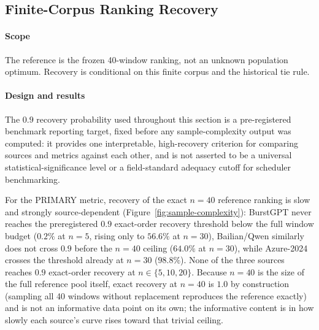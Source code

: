 \subsection{Finite-Corpus Ranking Recovery}
\label{sec:sample-complexity}

\paragraph{Scope}
\label{sec:sample-complexity-motivation}

The reference is the frozen 40-window ranking, not an unknown population optimum. Recovery is conditional on this finite corpus and the historical tie rule.

\paragraph{Design and results}
\label{sec:sample-complexity-design}

The $0.9$ recovery probability used throughout this section is a
pre-registered benchmark reporting target, fixed before any
sample-complexity output was computed: it provides one interpretable,
high-recovery criterion for comparing sources and metrics against each
other, and is not asserted to be a universal statistical-significance
level or a field-standard adequacy cutoff for scheduler benchmarking.

For the PRIMARY metric, recovery of the exact $n=40$ reference ranking is
slow and strongly source-dependent (Figure~\ref{fig:sample-complexity}): BurstGPT never reaches the preregistered
$0.9$ exact-order recovery threshold below the full window budget ($0.2\%$
at $n=5$, rising only to $56.6\%$ at $n=30$), Bailian/Qwen similarly does
not cross $0.9$ before the $n=40$ ceiling ($64.0\%$ at $n=30$), while Azure-2024
crosses the threshold already at $n=30$ ($98.8\%$). None of the three
sources reaches $0.9$ exact-order recovery at $n \in \{5,10,20\}$. Because
$n=40$ is the size of the full reference pool itself, exact recovery at
$n=40$ is $1.0$ by construction (sampling all 40 windows without
replacement reproduces the reference exactly) and is not an informative
data point on its own; the informative content is in how slowly each
source's curve rises toward that trivial ceiling.

